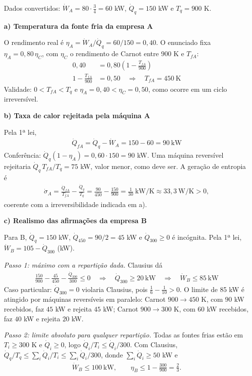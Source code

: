 \documentclass{article}%
\begin{document}
Dados convertidos: $\dot W_A=80\cdot\frac34=60$ kW, $\dot Q_q=150$ kW e $T_q=900$ K.

\textbf{a) Temperatura da fonte fria da empresa A}

O rendimento real é $\eta_A=\dot W_A/\dot Q_q=60/150=0{,}40$. O enunciado fixa $\eta_A=0{,}80\,\eta_C$, com $\eta_C$ o rendimento de Carnot entre $900$ K e $T_{fA}$:
\begin{align*}
0{,}40&=0{,}80\left(1-\frac{T_{fA}}{900}\right)\\
1-\frac{T_{fA}}{900}&=0{,}50\quad\Rightarrow\quad T_{fA}=450\ \text{K}
\end{align*}
Validade: $0<T_{fA}<T_q$ e $\eta_A=0{,}40<\eta_C=0{,}50$, como ocorre em um ciclo irreversível.

\textbf{b) Taxa de calor rejeitada pela máquina A}

Pela 1ª lei,
\begin{align*}
\dot Q_{fA}=\dot Q_q-\dot W_A=150-60=90\ \text{kW}
\end{align*}
Conferência: $\dot Q_q(1-\eta_A)=0{,}60\cdot150=90$ kW. Uma máquina reversível rejeitaria $\dot Q_q\,T_{fA}/T_q=75$ kW, valor menor, como deve ser. A geração de entropia é
\begin{align*}
\dot\sigma_A=\frac{\dot Q_{fA}}{T_{fA}}-\frac{\dot Q_q}{T_q}=\frac{90}{450}-\frac{150}{900}=\frac{1}{30}\ \text{kW/K}\approx 33{,}3\ \text{W/K}>0,
\end{align*}
coerente com a irreversibilidade indicada em a).

\textbf{c) Realismo das afirmações da empresa B}

Para B, $\dot Q_q=150$ kW, $\dot Q_{450}=90/2=45$ kW e $\dot Q_{300}\ge0$ é incógnita. Pela 1ª lei, $\dot W_B=105-\dot Q_{300}$ (kW).

\textit{Passo 1: máximo com a repartição dada.} Clausius dá
\begin{align*}
\frac{150}{900}-\frac{45}{450}-\frac{\dot Q_{300}}{300}\le 0\quad\Rightarrow\quad \dot Q_{300}\ge 20\ \text{kW}\quad\Rightarrow\quad \dot W_B\le 85\ \text{kW}
\end{align*}
Caso particular: $\dot Q_{300}=0$ violaria Clausius, pois $\frac16-\frac1{10}>0$. O limite de 85 kW é atingido por máquinas reversíveis em paralelo: Carnot $900\to450$ K, com $90$ kW recebidos, faz $45$ kW e rejeita $45$ kW; Carnot $900\to300$ K, com $60$ kW recebidos, faz $40$ kW e rejeita $20$ kW.

\textit{Passo 2: limite absoluto para qualquer repartição.} Todas as fontes frias estão em $T_i\ge300$ K e $\dot Q_i\ge0$, logo $\dot Q_i/T_i\le\dot Q_i/300$. Com Clausius, $\dot Q_q/T_q\le\sum_i\dot Q_i/T_i\le\sum_i\dot Q_i/300$, donde $\sum_i\dot Q_i\ge 50$ kW e
\begin{align*}
\dot W_B\le 100\ \text{kW},\qquad \eta_B\le 1-\frac{300}{900}=\frac23.
\end{align*}
\end{document}
